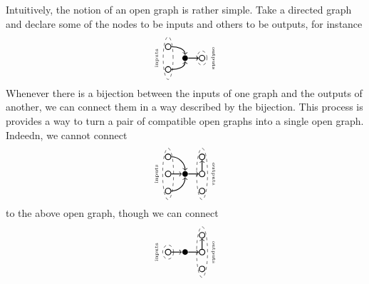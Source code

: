 \documentclass[11pt]{amsart}
\theoremstyle{remark}
\theoremstyle{definition}
\begin{document}
Intuitively, the notion of an open graph is rather simple.  Take a directed graph and declare some of the nodes to be inputs and others to be outputs, for instance
\[
\begin{tikzpicture}
	\begin{scope}
	\node [circle,draw,inner sep=2pt,thick] (1) at (-.2,0) {};
	\node [circle,fill,inner sep=2pt,thick] (2) at (-.8,0) {};
	\node [circle,draw,inner sep=2pt,thick] (3) at (-1.4,0.4) {};
	\node [circle,draw,inner sep=2pt,thick] (4) at (-1.4,-0.4) {};
	\draw [thick,->] (4) edge[out=0,in=-90] (2);
	\draw [thick,->] (3) edge[out=0,in=90] (2);
	\draw [thick,->] (2) edge (1);
	\draw [dashed] (-1.4,0) ellipse (0.5em and 0.75cm);
	\node [rotate=90] at (-1.8,0) {\tiny inputs};
	\draw [dashed] (-0.2,0) ellipse (0.5em and 0.25cm);
	\node [rotate=-90] at (0.2,0) {\tiny outputs};
	\end{scope}
\end{tikzpicture}
\]
Whenever there is a bijection between the inputs of one graph and the outputs of another, we can connect them in a way described by the bijection.  This process is provides a way to turn a pair of compatible open graphs into a single open graph.  Indeedn, we cannot connect 
\[
\begin{tikzpicture}
	\begin{scope}
	\node [circle,draw,inner sep=2pt,thick] (1) at (-.2,0.6) {};
	\node [circle,draw,inner sep=2pt,thick] (2) at (-.2,0) {};
	\node [circle,draw,inner sep=2pt,thick] (3) at (-.2,-0.6) {};
	\node [circle,fill,inner sep=2pt,thick] (4) at (-.8,0) {};
	\node [circle,draw,inner sep=2pt,thick] (5) at (-1.4,0.6) {};
	\node [circle,draw,inner sep=2pt,thick] (6) at (-1.4,0) {};
	\node [circle,draw,inner sep=2pt,thick] (7) at (-1.4,-0.6) {};
	\draw [thick,->] (7) edge[out=0,in=-90] (4);
	\draw [thick,->] (6) edge (4);
	\draw [thick,->] (5) edge[out=0,in=90] (4);
	\draw [thick,->] (4) edge (2);
	\draw [thick,->] (2) edge (1);
	\draw [dashed] (-1.4,0) ellipse (0.55em and 0.9cm);
	\node [rotate=90] at (-1.8,0) {\tiny inputs};
	\draw [dashed] (-0.2,0) ellipse (0.55em and 0.9cm);
	\node [rotate=-90] at (0.2,0) {\tiny outputs};
	\end{scope}
\end{tikzpicture}
\]
to the above open graph, though we can connect 
\[
\begin{tikzpicture}
	\begin{scope}
	\node [circle,draw,inner sep=2pt,thick] (1) at (-.2,0.6) {};
	\node [circle,draw,inner sep=2pt,thick] (2) at (-.2,0) {};
	\node [circle,draw,inner sep=2pt,thick] (3) at (-.2,-0.6) {};
	\node [circle,fill,inner sep=2pt,thick] (4) at (-.8,0) {};
	\node [circle,draw,inner sep=2pt,thick] (6) at (-1.4,0) {};
	\draw [thick,->] (6) edge (4);
	\draw [thick,->] (4) edge (2);
	\draw [thick,->] (2) edge (1);
	\draw [dashed] (-1.4,0) ellipse (0.55em and 0.25cm);
	\node [rotate=90] at (-1.8,0) {\tiny inputs};
	\draw [dashed] (-0.2,0) ellipse (0.55em and 0.9cm);
	\node [rotate=-90] at (0.2,0) {\tiny outputs};
	\end{scope}
\end{tikzpicture}
\]
\end{document}
